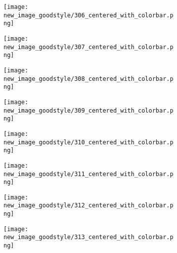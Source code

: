 \documentclass[a4paper,12pt]{article}
\begin{document}
\begin{figure}[H]
  \begin{subfigure}{0.11\textwidth}
    \texttt{[image: new\_image\_goodstyle/306\_centered\_with\_colorbar.png]}
  \end{subfigure}
  \hfill
  \begin{subfigure}{0.11\textwidth}
    \texttt{[image: new\_image\_goodstyle/307\_centered\_with\_colorbar.png]}
  \end{subfigure}
  \hfill
  \begin{subfigure}{0.11\textwidth}
    \texttt{[image: new\_image\_goodstyle/308\_centered\_with\_colorbar.png]}
  \end{subfigure}
  \hfill
  \begin{subfigure}{0.11\textwidth}
    \texttt{[image: new\_image\_goodstyle/309\_centered\_with\_colorbar.png]}
  \end{subfigure}
  \hfill
  \begin{subfigure}{0.11\textwidth}
    \texttt{[image: new\_image\_goodstyle/310\_centered\_with\_colorbar.png]}
  \end{subfigure}
  \hfill
  \begin{subfigure}{0.11\textwidth}
    \texttt{[image: new\_image\_goodstyle/311\_centered\_with\_colorbar.png]}
  \end{subfigure}
  \hfill
  \begin{subfigure}{0.11\textwidth}
    \texttt{[image: new\_image\_goodstyle/312\_centered\_with\_colorbar.png]}
  \end{subfigure}
  \hfill
  \begin{subfigure}{0.11\textwidth}
    \texttt{[image: new\_image\_goodstyle/313\_centered\_with\_colorbar.png]}
  \end{subfigure}
  \hfill
\end{figure}
\end{document}
